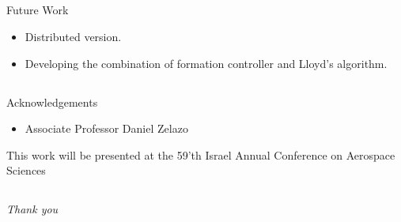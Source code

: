 \documentclass[t]{beamer}
\begin{document}
\subsection[Future Work]{}
\begin{frame}[label=futurework]{Future Work}
\begin{itemize}
\item Distributed version.
\item Developing the combination of formation controller and Lloyd's algorithm.
\end{itemize}
\end{frame}
\subsection[Acknowledgements]{}
\begin{frame}[label=acknowledgements]{Acknowledgements}
\begin{itemize}
\item Associate Professor Daniel Zelazo
\end{itemize} \pause
This work will be presented at the 59'th Israel Annual Conference on Aerospace Sciences
\end{frame}
\subsection[Thank you]{}
\begin{frame}{}
  \centering \Large
  \emph{Thank you}
\end{frame}
\end{document}
